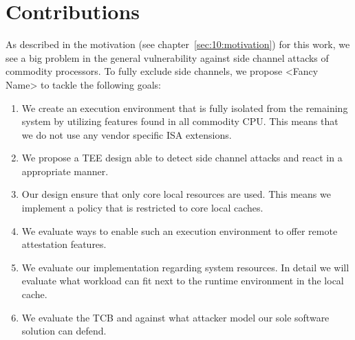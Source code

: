 \section{Contributions}
\label{sec:10:contributions}
As described in the motivation (see chapter~\ref{sec:10:motivation}) for this
work, we see a big problem in the general vulnerability against side channel
attacks of commodity processors.
To fully exclude side channels, we propose <Fancy Name> to tackle the following goals:

\begin{enumerate}
    \item We create an execution environment that is fully isolated from the
          remaining system by utilizing features found in all commodity CPU. This
          means that we do not use any vendor specific ISA extensions.
    \item We propose a TEE design able to detect side channel attacks and react
          in a appropriate manner.
    \item Our design ensure that only core local resources are used. This means
          we implement a policy that is restricted to core local caches.
    \item We evaluate ways to enable such an execution environment to offer
          remote attestation features.
    \item We evaluate our implementation regarding system resources. In detail
          we will evaluate what workload can fit next to the runtime
          environment in the local cache.
    \item We evaluate the TCB and against what attacker model our sole software
          solution can defend.
\end{enumerate}
